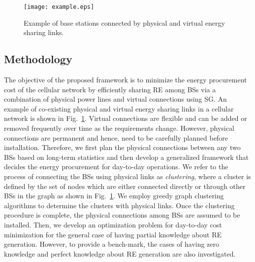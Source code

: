 \documentclass[10pt, letter,twocolumn]{IEEEtran}
\begin{document}

\begin{figure}
  \centering
  \texttt{[image: example.eps]}\vspace{-0.0in}
  \caption{Example of base stations connected by physical and virtual energy sharing links.}\label{ex1} \vspace{-0.1in}
\end{figure}
\vspace{-0.0cm}
\subsection{Methodology}

The objective of the proposed framework is to minimize the energy procurement cost of the cellular network by efficiently sharing RE among BSs via a combination of physical power lines and virtual connections using SG. An example of co-existing physical and virtual energy sharing links in a cellular network is shown in Fig.~\ref{ex1}. Virtual connections are flexible and can be added or removed frequently over time as the requirements change. However, physical connections are permanent and hence, need to be carefully planned before installation. Therefore, we first plan the physical connections between any two BSs based on long-term statistics and then develop a generalized framework that decides the energy procurement for day-to-day operations. We refer to the process of connecting the BSs using physical links as \emph{clustering}, where a cluster is defined by the set of nodes which are either connected directly or through other BSs in the graph as shown in Fig.~\ref{ex1}. We employ greedy graph clustering algorithms to determine the clusters with physical links. Once the clustering procedure is complete, the physical connections among BSs are assumed to be installed. Then, we develop an optimization problem for day-to-day cost minimization for the general case of having partial knowledge about RE generation. However, to provide a bench-mark, the cases of having zero knowledge and perfect knowledge about RE generation are also investigated.
\end{document}
